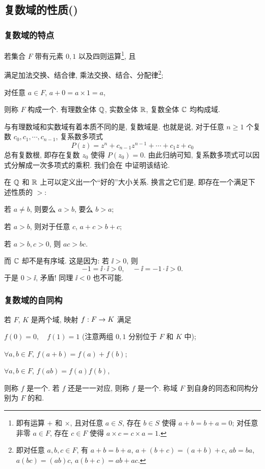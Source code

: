 \subsection{复数域的性质(\optional)}
\label{ssec:complex-field}

\subsubsection{复数域的特点}

若集合 $F$ 带有元素 $0,1$ 以及四则运算\footnote{%
  即有运算 $+$ 和 $\times$, 且对任意 $a\in S$, 存在 $b\in S$ 使得 $a+b=b+a=0$; 对任意非零 $a\in F$, 存在 $c\in F$ 使得 $a\times c=c\times a=1$.%
}, 且
\begin{enuma}
  \item 满足加法交换、结合律, 乘法交换、结合、分配律\footnote{即对任意 $a,b,c\in F$, 有 $a+b=b+a$, $a+(b+c)=(a+b)+c$, $ab=ba$, $a(bc)=(ab)c$, $a(b+c)=ab+ac$.};
  \item 对任意 $a\in F$, $a+0=a\times 1=a$,
\end{enuma}\parnoindent
则称 $F$ 构成一个.
有理数全体 ${\mathbb{Q}}$, 实数全体 ${\mathbb{R}}$, 复数全体 ${\mathbb{C}}$ 均构成域.

与有理数域和实数域有着本质不同的是, 复数域是.
也就是说, 对于任意 $n\ge 1$ 个复数 $c_0,c_1,\cdots,c_{n-1}$, 复系数多项式
\[
  P(z)=z^n+c_{n-1}z^{n-1}+\cdots+c_1z+c_0
\]
总有复数根, 即存在复数 $z_0$ 使得 $P(z_0)=0$.
由此归纳可知, 复系数多项式可以因式分解成一次多项式的乘积.
我们会在 中证明该结论.

在 ${\mathbb{Q}}$ 和 ${\mathbb{R}}$ 上可以定义出一个``好的''大小关系.
换言之它们是, 即存在一个满足下述性质的 $>$:
\begin{enuma}
  \item 若 $a\neq b$, 则要么 $a>b$, 要么 $b>a$;
  \item 若 $a>b$, 则对于任意 $c$, $a+c>b+c$;
  \item 若 $a>b,c>0$, 则 $ac>bc$.
\end{enuma}\parnoindent
而 \alert{${\mathbb{C}}$ 却不是有序域}.
这是因为: 若 $\ii>0$, 则
\[
  -1=\ii\cdot \ii>0,\quad -\ii=-1\cdot \ii>0.
\]
于是 $0>\ii$, 矛盾! 同理 $\ii<0$ 也不可能.


\subsubsection{复数域的自同构}
\label{sssec:complex-field-isomorphism}

若 $F$, $K$ 是两个域, 映射 $f:F\rightarrow K$ 满足
\begin{enuma}
  \item $f(0)=0,\quad f(1)=1$ (注意两组 $0,1$ 分别位于 $F$ 和 $K$ 中);
  \item $\forall a,b\in F$, $f(a+b)=f(a)+f(b)$;
  \item $\forall a,b\in F$, $f(ab)=f(a)f(b)$,
\end{enuma}\parnoindent
则称 $f$ 是一个.
若 $f$ 还是一一对应, 则称 $f$ 是一个.
称域 $F$ 到自身的同态和同构分别为 $F$ 的和.

